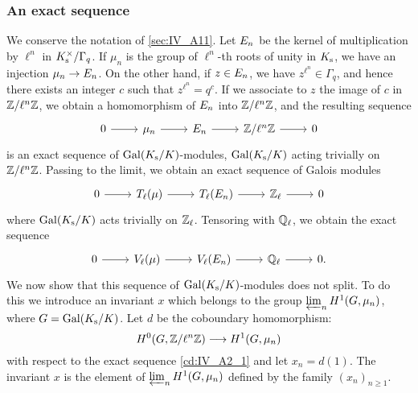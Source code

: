 \begin{subappendices}
\subsubsection{An exact sequence}
\label{sec:IV_A12}
We conserve the notation of \ref{sec:IV_A11}.
\dpage
Let ${E}_{n}$ be the kernel of multiplication by $\ell^n$ in $K_{\mathrm{s}}^\times/\Gamma_q$. If $\mu_n$ is the group of $\ell^n$-th roots of unity in
$K_{\mathrm{s}}$, we have an injection $\mu_n \to {E}_{n}$. On the other hand, if
$z \in {E}_{n}$, we have $z^{\ell^n} \in \Gamma_q$, and hence there exists
an integer $c$ such that $z^{\ell^n} = q^c$. If we associate to $z$ the image
of $c$ in $\mathbb{Z}/\ell^n\mathbb{Z}$, we obtain a homomorphism of ${E}_{n}$ into
$\mathbb{Z}/\ell^n\mathbb{Z}$, and the resulting sequence
\begin{equation}
	\begin{tikzcd}
		0 \rar & \mu_n \rar & \tors{E}{n} \rar & \Z/\ell^n\Z \rar & 0
	\end{tikzcd}
	\label{cd:IV_A2_1}
\end{equation}
is an exact sequence of $\operatorname{Gal}(K_{\mathrm{s}}/K)$-modules, $\operatorname{Gal}(K_{\mathrm{s}}/K)$ acting
trivially on $\mathbb{Z}/\ell^n\mathbb{Z}$. Passing to the limit, we obtain an exact sequence
of Galois modules
\begin{equation}
	\begin{tikzcd}
		0 \rar & T_\ell(\mu) \rar & T_\ell(\tors{E}{n}) \rar & \Z_\ell
		\rar & 0
	\end{tikzcd}
\end{equation}
where $\operatorname{Gal}(K_{\mathrm{s}}/K)$ acts trivially on $\mathbb{Z}_\ell$. Tensoring with $\mathbb{Q}_\ell$, we
obtain the exact sequence
\begin{equation}
	\begin{tikzcd}
		0 \rar & V_\ell(\mu) \rar & V_\ell(\tors{E}{n}) \rar & \Q_\ell
		\rar & 0.
	\end{tikzcd}
	\label{cd:IV_A2_3}
\end{equation}
We now show that this sequence of $\operatorname{Gal}(K_{\mathrm{s}}/K)$-modules does not split. To
do this we introduce an invariant $x$ which belongs to the group $\varprojlim_n
H^1(G, \mu_n)$, where $G = \operatorname{Gal}(K_{\mathrm{s}}/K)$. Let $d$ be the coboundary
homomorphism:
\[
	H^0(G, \mathbb{Z}/\ell^n\mathbb{Z}) \longrightarrow H^1(G, \mu_n)
\]
with respect to the exact sequence \eqref{cd:IV_A2_1} and let $x_n = d(1)$. The
invariant $x$ is the element of $\varprojlim_n H^1(G, \mu_n)$ defined by the family
$(x_n)_{n \ge 1}$.


\end{subappendices}
